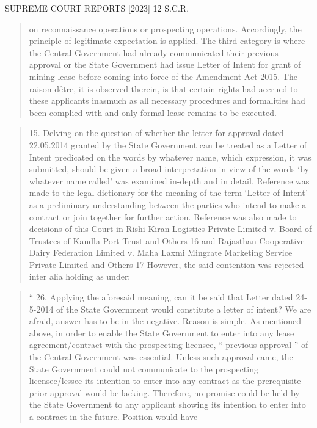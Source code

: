 \documentclass[12pt,a4paper]{article}
\newenvironment{judgequote}
  {\begin{quote}\small}
  {\end{quote}}
\begin{document}

 SUPREME COURT REPORTS [2023] 12 S.C.R.


\begin{judgequote}
on reconnaissance operations or prospecting operations. Accordingly, the
principle of legitimate expectation is applied. The third category is where
the Central Government had already communicated their previous approval
or the State Government had issue Letter of Intent for grant of mining lease
before coming into force of the Amendment Act 2015. The raison dêtre,
it is observed therein, is that certain rights had accrued to these applicants
inasmuch as all necessary procedures and formalities had been complied
with and only formal lease remains to be executed.
\end{judgequote}

\begin{judgequote}
15. Delving on the question of whether the letter for approval dated
22.05.2014 granted by the State Government can be treated as a Letter of
Intent predicated on the words by whatever name, which expression, it was
submitted, should be given a broad interpretation in view of the words `by
whatever name called' was examined in-depth and in detail. Reference was
made to the legal dictionary for the meaning of the term `Letter of Intent'
as a preliminary understanding between the parties who intend to make
a contract or join together for further action. Reference was also made to
decisions of this Court in Rishi Kiran Logistics Private Limited v. Board
of Trustees of Kandla Port Trust and Others 16 and Rajasthan Cooperative
Dairy Federation Limited v. Maha Laxmi Mingrate Marketing Service
Private Limited and Others 17 However, the said contention was rejected
inter alia holding as under:
\end{judgequote}

\begin{judgequote}
`` 26. Applying the aforesaid meaning, can it be said that Letter dated
24-5-2014 of the State Government would constitute a letter of intent?
We are afraid, answer has to be in the negative. Reason is simple. As
mentioned above, in order to enable the State Government to enter into
any lease agreement/contract with the prospecting licensee, `` previous
approval '' of the Central Government was essential. Unless such
approval came, the State Government could not communicate to the
prospecting licensee/lessee its intention to enter into any contract as the
prerequisite prior approval would be lacking. Therefore, no promise
could be held by the State Government to any applicant showing its
intention to enter into a contract in the future. Position would have
\end{judgequote}
\end{document}
